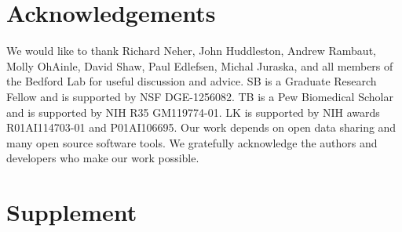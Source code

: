 \documentclass[11pt,oneside,letterpaper]{article}
\begin{document}
\section*{Acknowledgements}
We would like to thank Richard Neher, John Huddleston, Andrew Rambaut, Molly OhAinle, David Shaw, Paul Edlefsen, Michal Juraska, and all members of the Bedford Lab for useful discussion and advice.
SB is a Graduate Research Fellow and is supported by NSF DGE-1256082.
TB is a Pew Biomedical Scholar and is supported by NIH R35 GM119774-01.
LK is supported by NIH awards R01AI114703-01 and P01AI106695.
Our work depends on open data sharing and many open source software tools.
We gratefully acknowledge the authors and developers who make our work possible.




\newpage

\section*{Supplement}

\setcounter{figure}{0}
\setcounter{table}{0}
\renewcommand{\thefigure}{S\arabic{figure}}
\renewcommand{\thetable}{S\arabic{table}}
\end{document}
